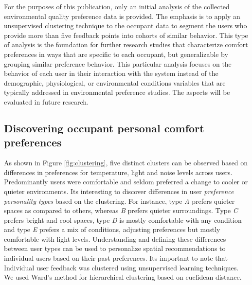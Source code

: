 
For the purposes of this publication, only an initial analysis of the collected environmental quality preference data is provided. The emphasis is to apply an unsupervised clustering technique to the occupant data to segment the users who provide more than five feedback points into cohorts of similar behavior. This type of analysis is the foundation for further research studies that characterize comfort preferences in ways that are specific to each occupant, but generalizable by grouping similar preference behavior. This particular analysis focuses on the behavior of each user in their interaction with the system instead of the demographic, physiological, or environmental conditions variables that are typically addressed in environmental preference studies. The aspects will be evaluated in future research. 

\subsection{Discovering occupant personal comfort preferences}
 
As shown in Figure \ref{fig:clustering}, five distinct clusters can be observed based on differences in preferences for temperature, light and noise levels across users. Predominantly users were comfortable and seldom preferred a change to cooler or quieter environments. Its interesting to discover differences in user \emph{preference personality types} based on the clustering. For instance, type \emph{A} prefers quieter spaces as compared to others, whereas \emph{B} prefers quieter surroundings. Type \emph{C} prefers bright and cool spaces, type \emph{D} is mostly comfortable with any condition and type \emph{E} prefers a mix of conditions, adjusting preferences but mostly comfortable with light levels. Understanding and defining these differences between user types can be used to personalize spatial recommendations to individual users based on their past preferences. Its important to note that Individual user feedback was clustered using unsupervised learning techniques. We used Ward's method for hierarchical clustering based on euclidean distance. 




